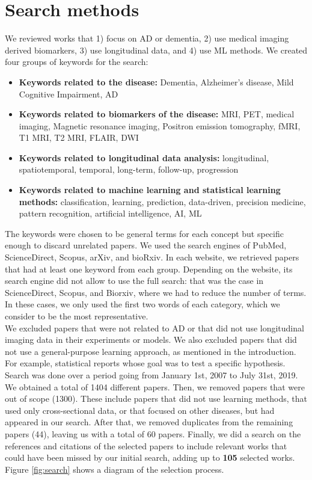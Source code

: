\section{Search methods}
\label{sec:search}

We reviewed works that 1) focus on AD or dementia, 2) use medical imaging derived biomarkers, 3) use longitudinal data, and 4) use ML methods. We created four groups of keywords for the search:

\begin{itemize}\itemsep5pt
  \item \textbf{Keywords related to the disease:} Dementia, Alzheimer’s disease, Mild Cognitive Impairment, AD
  \item \textbf{Keywords related to biomarkers of the disease:} MRI, PET, medical imaging, Magnetic resonance imaging, Positron emission tomography, fMRI, T1 MRI, T2 MRI, FLAIR, DWI
  \item \textbf{Keywords related to longitudinal data analysis:} longitudinal, spatiotemporal, temporal, long-term, follow-up, progression
  \item \textbf{Keywords related to machine learning and statistical learning methods:} classification, learning, prediction, data-driven, precision medicine, pattern recognition, artificial intelligence, AI, ML
\end{itemize}

The keywords were chosen to be general terms for each concept but specific enough to discard unrelated papers. We used the search engines of PubMed, ScienceDirect, Scopus, arXiv, and bioRxiv. In each website, we retrieved papers that had at least one keyword from each group. Depending on the website, its search engine did not allow to use the full search: that was the case in ScienceDirect, Scopus, and Biorxiv, where we had to reduce the number of terms. In these cases, we only used the first two words of each category, which we consider to be the most representative. \\

We excluded papers that were not related to AD or that did not use longitudinal imaging data in their experiments or models. We also excluded papers that did not use a general-purpose learning approach, as mentioned in the introduction. For example, statistical reports whose goal was to test a specific hypothesis. \\

Search was done over a period going from January 1st, 2007 to July 31st, 2019. We obtained a total of 1404 different papers. Then, we removed papers that were out of scope (1300). These include papers that did not use learning methods, that used only cross-sectional data, or that focused on other diseases, but had appeared in our search. After that, we removed duplicates from the remaining papers (44), leaving us with a total of 60 papers. Finally, we did a search on the references and citations of the selected papers to include relevant works that could have been missed by our initial search, adding up to \textbf{105} selected works. Figure \ref{fig:search} shows a diagram of the selection process.

